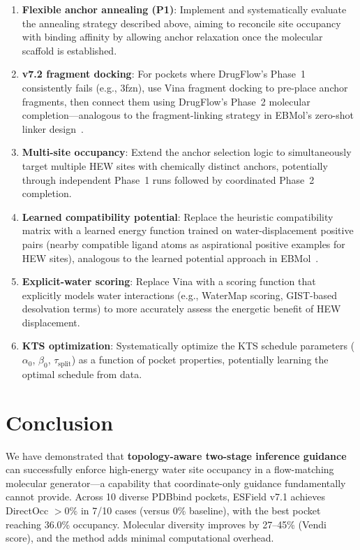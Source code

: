 \documentclass[11pt,letterpaper]{article}
\begin{document}
\begin{enumerate}[leftmargin=*]
  \item \textbf{Flexible anchor annealing (P1)}: Implement and systematically
    evaluate the annealing strategy described above, aiming to reconcile site
    occupancy with binding affinity by allowing anchor relaxation once the
    molecular scaffold is established.
  \item \textbf{v7.2 fragment docking}: For pockets where DrugFlow's Phase~1
    consistently fails (e.g., 3fzn), use Vina fragment docking to pre-place
    anchor fragments, then connect them using DrugFlow's Phase~2 molecular
    completion---analogous to the fragment-linking strategy in EBMol's zero-shot
    linker design~\cite{griesbacher2026ebmol}.
  \item \textbf{Multi-site occupancy}: Extend the anchor selection logic to
    simultaneously target multiple HEW sites with chemically distinct anchors,
    potentially through independent Phase~1 runs followed by coordinated
    Phase~2 completion.
  \item \textbf{Learned compatibility potential}: Replace the heuristic
    compatibility matrix with a learned energy function trained on
    water-displacement positive pairs (nearby compatible ligand atoms as
    aspirational positive examples for HEW sites), analogous to the learned
    potential approach in EBMol~\cite{griesbacher2026ebmol}.
  \item \textbf{Explicit-water scoring}: Replace Vina with a scoring function
    that explicitly models water interactions (e.g., WaterMap scoring,
    GIST-based desolvation terms) to more accurately assess the energetic
    benefit of HEW displacement.
  \item \textbf{KTS optimization}: Systematically optimize the KTS schedule
    parameters ($\alpha_0$, $\beta_0$, $\tau_{\text{split}}$) as a function of
    pocket properties, potentially learning the optimal schedule from data.
\end{enumerate}

\section{Conclusion}

We have demonstrated that \textbf{topology-aware two-stage inference guidance}
can successfully enforce high-energy water site occupancy in a flow-matching
molecular generator---a capability that coordinate-only guidance fundamentally
cannot provide.  Across 10 diverse PDBbind pockets, ESField v7.1 achieves
DirectOcc $> 0\%$ in 7/10 cases (versus 0\% baseline), with the best pocket
reaching 36.0\% occupancy.  Molecular diversity improves by 27--45\% (Vendi
score), and the method adds minimal computational overhead.
\end{document}
